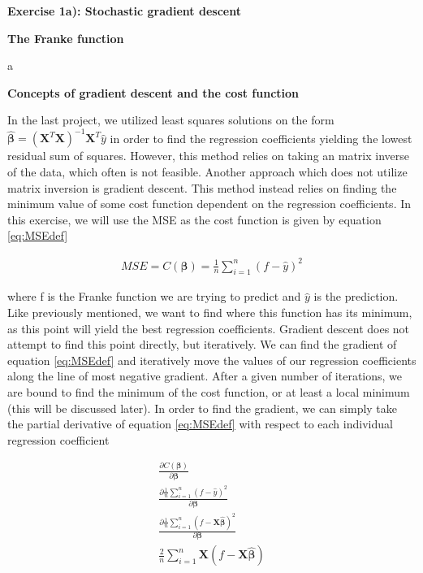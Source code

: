\documentclass[12pt,a4paper]{article}
\begin{document}
\newpage

\begin{center}
\Large{\textbf{Exercise 1a): Stochastic gradient descent}}
\end{center}

\begin{center}
\large{\textbf{The Franke function}}
\end{center}

\noindent a

\begin{center}
\large{\textbf{Concepts of gradient descent and the cost function}}
\end{center}

\noindent In the last project, we utilized least squares solutions on the form $\boldsymbol{\hat{\beta}} = (\textbf{X}^T\textbf{X})^{-1}\textbf{X}^T\hat{y}$ in order to find the regression coefficients yielding the lowest residual sum of squares. However, this method relies on taking an matrix inverse of the data, which often is not feasible. Another approach which does not utilize matrix inversion is gradient descent. This method instead relies on finding the minimum value of some cost function dependent on the regression coefficients. In this exercise, we will use the MSE as the cost function is given by equation \ref{eq:MSEdef}

\begin{equation}\label{eq:MSEdef}
\begin{aligned}
MSE = C(\boldsymbol{\beta}) = \frac{1}{n}\sum_{i = 1}^n (f - \hat{y})^2
\end{aligned}
\end{equation}

\noindent where f is the Franke function we are trying to predict and $\hat{y}$ is the prediction. Like previously mentioned, we want to find where this function has its minimum, as this point will yield the best regression coefficients. Gradient descent does not attempt to find this point directly, but iteratively. We can find the gradient of equation \ref{eq:MSEdef} and iteratively move the values of our regression coefficients along the line of most negative gradient. After a given number of iterations, we are bound to find the minimum of the cost function, or at least a local minimum (this will be discussed later). In order to find the gradient, we can simply take the partial derivative of equation \ref{eq:MSEdef} with respect to each individual regression coefficient

\begin{equation}\label{eq:MSEder}
\begin{aligned}
\frac{\partial C(\boldsymbol{\beta})}{\partial \boldsymbol{\beta}} 
\\
\frac{\partial \frac{1}{n} \sum_{i = 1}^n (f-\hat{y})^2}{\partial \boldsymbol{\beta}} 
\\
\frac{\partial \frac{1}{n} \sum_{i = 1}^n (f-\textbf{X}\boldsymbol{\hat{\beta}})^2}{\partial \boldsymbol{\beta}} 
\\
\frac{2}{n} \sum_{i = 1}^n \textbf{X}(f - \textbf{X}\boldsymbol{\hat{\beta}}) 
\end{aligned}
\end{equation}
\end{document}
